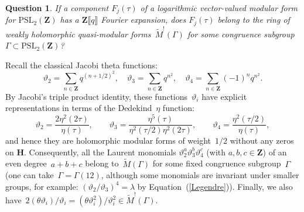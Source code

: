 \documentclass[10pt]{amsart}
\def\PSL{\mathrm{PSL}}
\def\WM{\widetilde{M}}
\def\Z{\mathbf{Z}}
\newtheorem{question}[subsubsection]{Question}
\theoremstyle{remark}
\numberwithin{equation}{subsection}
\def\H{\mathbf{H}}
\begin{document}
\begin{question}  \label{logarithmic UDC}
If a component $F_j(\tau)$ of a logarithmic vector-valued modular form for $\PSL_2(\Z)$ has a $\Z\llbracket q\rrbracket$ Fourier expansion, does $F_j(\tau)$ belong to the ring of 
weakly holomorphic quasi-modular forms~$\WM^{!}(\Gamma)$ 
for some \emph{congruence} subgroup~$\Gamma \subset \PSL_2(\Z)$?
\end{question}

Recall the classical Jacobi theta functions:
$$\vartheta_2 =  \sum_{n \in \Z} q^{(n+1/2)^2}, \quad
\vartheta_3 =  \sum_{n \in \Z} q^{n^2}, 
\quad
\vartheta_4 =   \sum_{n \in \Z}(-1)^n q^{n^2}.$$
By Jacobi's triple product identity, these functions~$\vartheta_i$ have explicit representations in terms of the Dedekind~$\eta$ function:
$$\vartheta_2 =   \frac{2 \eta^2(2 \tau)}{\eta(\tau)},
\qquad
\vartheta_3 =  \frac{\eta^5(\tau)}{\eta^2(\tau/2) \eta^2(2 \tau)}, 
\qquad
\vartheta_4 =    \frac{\eta^2(\tau/2)}{\eta(\tau)},$$
and hence they are holomorphic modular forms of weight~$1/2$ without any zeros on $\H$. 
Consequently, all the Laurent monomials $\vartheta_2^a\vartheta_3^b\vartheta_4^c$ (with $a,b,c \in \Z$) of an even degree~$a+b+c$ 
belong to~$ \WM(\Gamma)$
for some fixed congruence subgroup~$\Gamma$ (one can take~$\Gamma = \Gamma(12)$,
although some monomials are invariant under smaller groups, for example: $(\vartheta_2/\vartheta_3)^4 = \lambda$ by Equation~(\ref{Legendre})).
Finally, we also have~$2 (\theta \vartheta_i)/\vartheta_i =  (\theta \vartheta^2_i)/\vartheta^2_i \in \WM^{!}(\Gamma)$.

\medskip
\end{document}
